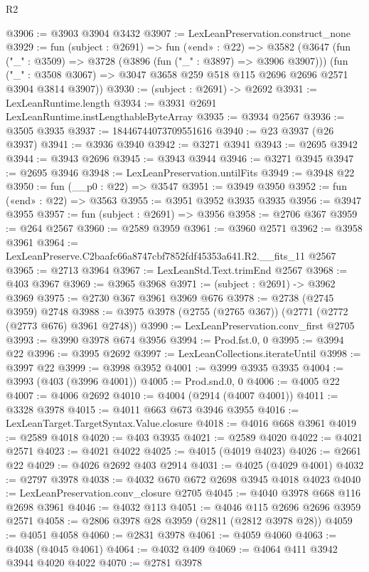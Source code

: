 \begin{lexlean}{R2}
\begin{coremodule}
@3906 := @3903 @3904 @3432
@3907 := LexLeanPreservation.construct_none
@3929 := fun (subject : @2691) =>
  fun («end» : @22) =>
  @3582
    (@3647
      (fun ("_" : @3509) => @3728 (@3896 (fun ("_" : @3897) => @3906 @3907)))
      (fun ("_" : @3508 @3067) => @3047 @3658 @259 @518 @115 @2696 @2696 @2571 @3904 @3814 @3907))
@3930 := (subject : @2691) -> @2692
@3931 := LexLeanRuntime.length
@3934 := @3931 @2691 LexLeanRuntime.instLengthableByteArray
@3935 := @3934 @2567
@3936 := @3505 @3935
@3937 := 18446744073709551616
@3940 := @23 @3937 (@26 @3937)
@3941 := @3936 @3940
@3942 := @3271 @3941
@3943 := @2695 @3942
@3944 := @3943 @2696
@3945 := @3943 @3944
@3946 := @3271 @3945
@3947 := @2695 @3946
@3948 := LexLeanPreservation.untilFits
@3949 := @3948 @22
@3950 := fun (__p0 : @22) => @3547
@3951 := @3949 @3950
@3952 := fun («end» : @22) => @3563
@3955 := @3951 @3952 @3935 @3935
@3956 := @3947 @3955
@3957 := fun (subject : @2691) => @3956
@3958 := @2706 @367
@3959 := @264 @2567
@3960 := @2589 @3959
@3961 := @3960 @2571
@3962 := @3958 @3961
@3964 := LexLeanPreserve.C2baafc66a8747cbf7852fdf45353a641.R2.__fits_11 @2567
@3965 := @2713 @3964
@3967 := LexLeanStd.Text.trimEnd @2567
@3968 := @403 @3967
@3969 := @3965 @3968
@3971 := (subject : @2691) -> @3962 @3969
@3975 := @2730 @367 @3961 @3969 @676
@3978 := @2738 (@2745 @3959) @2748
@3988 := @3975 @3978 (@2755 (@2765 @367)) (@2771 (@2772 (@2773 @676) @3961 @2748))
@3990 := LexLeanPreservation.conv_first @2705
@3993 := @3990 @3978 @674 @3956
@3994 := Prod.fst.{0, 0}
@3995 := @3994 @22
@3996 := @3995 @2692
@3997 := LexLeanCollections.iterateUntil
@3998 := @3997 @22
@3999 := @3998 @3952
@4001 := @3999 @3935 @3935
@4004 := @3993 (@403 (@3996 @4001))
@4005 := Prod.snd.{0, 0}
@4006 := @4005 @22
@4007 := @4006 @2692
@4010 := @4004 (@2914 (@4007 @4001))
@4011 := @3328 @3978
@4015 := @4011 @663 @673 @3946 @3955
@4016 := LexLeanTarget.TargetSyntax.Value.closure
@4018 := @4016 @668 @3961
@4019 := @2589 @4018
@4020 := @403 @3935
@4021 := @2589 @4020
@4022 := @4021 @2571
@4023 := @4021 @4022
@4025 := @4015 (@4019 @4023)
@4026 := @2661 @22
@4029 := @4026 @2692 @403 @2914
@4031 := @4025 (@4029 @4001)
@4032 := @2797 @3978
@4038 := @4032 @670 @672 @2698 @3945 @4018 @4023
@4040 := LexLeanPreservation.conv_closure @2705
@4045 := @4040 @3978 @668 @116 @2698 @3961
@4046 := @4032 @113
@4051 := @4046 @115 @2696 @2696 @3959 @2571
@4058 := @2806 @3978 @28 @3959 (@2811 (@2812 @3978 @28))
@4059 := @4051 @4058
@4060 := @2831 @3978
@4061 := @4059 @4060
@4063 := @4038 (@4045 @4061)
@4064 := @4032 @409
@4069 := @4064 @411 @3942 @3944 @4020 @4022
@4070 := @2781 @3978

\end{coremodule}
\end{lexlean}
